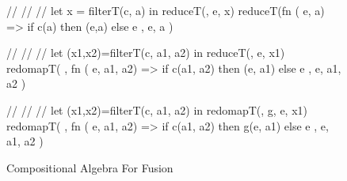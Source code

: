 \begin{figure}[bt]
\begin{colorcode}
//
//
//
let x = filterT(c, a)
in  reduceT(\mymath{\oplus}, e, x)
    \emphh{\mymath{\equiv}}
reduceT(fn \mymath{\beta} (\mymath{\beta} e, \mymath{\beta} a) =>
  if c(a) then \mymath{\oplus}(e,a) else e
, e, a )

//
//
//
let (x1,x2)=filterT(c, a1, a2)
in  reduceT(\mymath{\oplus}, e, x1)
    \emphh{\mymath{\equiv}}
redomapT(\mymath{\oplus}
, fn \mymath{\beta} (\mymath{\beta} e,  a1,  a2)
   => if c(a1, a2)
      then \mymath{\oplus}(e, a1) else e
, e, a1, a2 )

//
//
//
let (x1,x2)=filterT(c, a1, a2)
in  redomapT(\mymath{\oplus}, g, e, x1)
    \emphh{\mymath{\equiv}}
redomapT(\mymath{\oplus}
, fn \mymath{\beta} (\mymath{\beta} e,  a1,  a2)
   => if c(a1, a2)
      then g(e, a1) else e
, e, a1, a2 )
\end{colorcode}
\caption{Compositional Algebra For Fusion}
\label{fig:fusion-algebra}
\end{figure}

